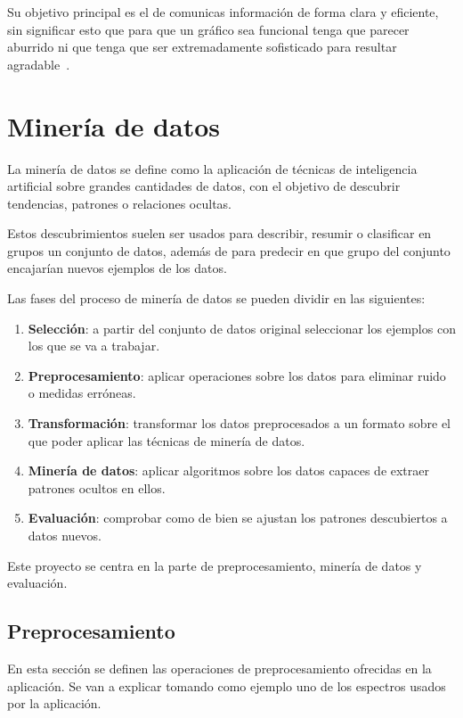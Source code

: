 Su objetivo principal es el de comunicas información de forma clara y eficiente,
sin significar esto que para que un gráfico sea funcional tenga que parecer
aburrido ni que tenga que ser extremadamente sofisticado para resultar
agradable~\cite{friedman2008}.

\section{Minería de datos}

La minería de datos se define como la aplicación de técnicas de inteligencia
artificial sobre grandes cantidades de datos, con el objetivo de descubrir
tendencias, patrones o relaciones ocultas.

Estos descubrimientos suelen ser usados para describir, resumir o clasificar en
grupos un conjunto de datos, además de para predecir en que grupo del conjunto
encajarían nuevos ejemplos de los datos.

Las fases del proceso de minería de datos se pueden dividir en las siguientes:
\begin{enumerate}
	\item \textbf{Selección}: a partir del conjunto de datos original seleccionar
	los ejemplos con los que se va a trabajar.
	\item \textbf{Preprocesamiento}: aplicar operaciones sobre los datos para
	eliminar ruido o medidas erróneas.
	\item \textbf{Transformación}: transformar los datos preprocesados a un formato
	sobre el que poder aplicar las técnicas de minería de datos.
	\item \textbf{Minería de datos}: aplicar algoritmos sobre los datos capaces de
	extraer patrones ocultos en ellos.
	\item \textbf{Evaluación}: comprobar como de bien se ajustan los patrones
	descubiertos a datos nuevos.
\end{enumerate}

Este proyecto se centra en la parte de preprocesamiento, minería de datos y
evaluación.

\subsection{Preprocesamiento}

En esta sección se definen las operaciones de preprocesamiento ofrecidas en la
aplicación. Se van a explicar tomando como ejemplo uno de los espectros usados
por la aplicación.

